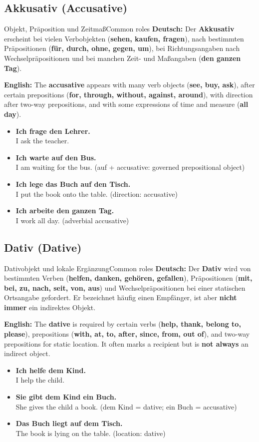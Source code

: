 \documentclass[a4paper,11pt]{article}
\newcommand{\GermanText}[1]{\textbf{Deutsch: }#1\par}
\newcommand{\EnglishText}[1]{{\small\color{SoftGray}\textbf{English: }#1\par}}
\newcommand{\ExampleItem}[2]{\item \textbf{#1}\\{\small\color{SoftGray}#2}}
\begin{document}
        \subsection{Akkusativ \textnormal{(Accusative)}}
            \begin{grammarentry}{Objekt, Präposition und Zeitmaß}{Common roles}
                \GermanText{Der \textbf{Akkusativ} erscheint bei vielen Verbobjekten (\textbf{sehen, kaufen, fragen}), nach bestimmten Präpositionen (\textbf{für, durch, ohne, gegen, um}), bei Richtungsangaben nach Wechselpräpositionen und bei manchen Zeit- und Maßangaben (\textbf{den ganzen Tag}).}
                \EnglishText{The \textbf{accusative} appears with many verb objects (\textbf{see, buy, ask}), after certain prepositions (\textbf{for, through, without, against, around}), with direction after two-way prepositions, and with some expressions of time and measure (\textbf{all day}).}
            \end{grammarentry}
            \begin{exbox}\begin{itemize}
                \ExampleItem{Ich frage den Lehrer.}{I ask the teacher.}
                \ExampleItem{Ich warte auf den Bus.}{I am waiting for the bus. (auf + accusative: governed prepositional object)}
                \ExampleItem{Ich lege das Buch auf den Tisch.}{I put the book onto the table. (direction: accusative)}
                \ExampleItem{Ich arbeite den ganzen Tag.}{I work all day. (adverbial accusative)}
            \end{itemize}\end{exbox}

        \subsection{Dativ \textnormal{(Dative)}}
            \begin{grammarentry}{Dativobjekt und lokale Ergänzung}{Common roles}
                \GermanText{Der \textbf{Dativ} wird von bestimmten Verben (\textbf{helfen, danken, gehören, gefallen}), Präpositionen (\textbf{mit, bei, zu, nach, seit, von, aus}) und Wechselpräpositionen bei einer statischen Ortsangabe gefordert. Er bezeichnet häufig einen Empfänger, ist aber \textbf{nicht immer} ein indirektes Objekt.}
                \EnglishText{The \textbf{dative} is required by certain verbs (\textbf{help, thank, belong to, please}), prepositions (\textbf{with, at, to, after, since, from, out of}), and two-way prepositions for static location. It often marks a recipient but is \textbf{not always} an indirect object.}
            \end{grammarentry}
            \begin{exbox}\begin{itemize}
                \ExampleItem{Ich helfe dem Kind.}{I help the child.}
                \ExampleItem{Sie gibt dem Kind ein Buch.}{She gives the child a book. (dem Kind = dative; ein Buch = accusative)}
                \ExampleItem{Das Buch liegt auf dem Tisch.}{The book is lying on the table. (location: dative)}
            \end{itemize}\end{exbox}
\end{document}
